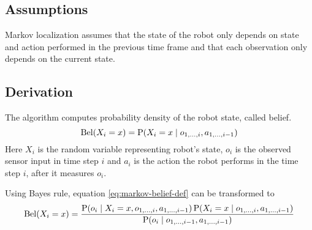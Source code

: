 \subsection{Assumptions}
\label{sec:markov_assumptions}
Markov localization assumes that the state of the robot only depends
on state and action performed in the previous time frame
and that each observation only depends on the current state.


\subsection{Derivation}

The algorithm computes probability density of the robot state, called belief.
\begin{equation}
	\label{eq:markov-belief-def}
	\operatorname{\mathrm{Bel}}(X_i = x) = \operatorname{\mathrm{P}}(X_i = x \mid o_{1, \dotsc, i}, a_{1,\dotsc,i - 1})
\end{equation}
Here \(X_i\) is the random variable representing robot's state,
\(o_i\) is the observed sensor input in time step \(i\) and \(a_i\)
is the action the robot performs in the time step \(i\), after it
measures \(o_i\).

Using Bayes rule, equation \eqref{eq:markov-belief-def} can be transformed to
\begin{equation}
	\label{eq:markov-derivation1}
	\operatorname{\mathrm{Bel}}(X_i = x) =
	\frac{
		\operatorname{\mathrm{P}}(o_i \mid X_i = x, o_{1, \dotsc, i}, a_{1,\dotsc,i - 1})
		\operatorname{\mathrm{P}}(X_i = x \mid o_{1, \dotsc, i}, a_{1, \dotsc, i - 1})
	}{
		\operatorname{\mathrm{P}}(o_i \mid o_{1, \dotsc, i-1}, a_{1, \dotsc, i-1})
	}
\end{equation}

